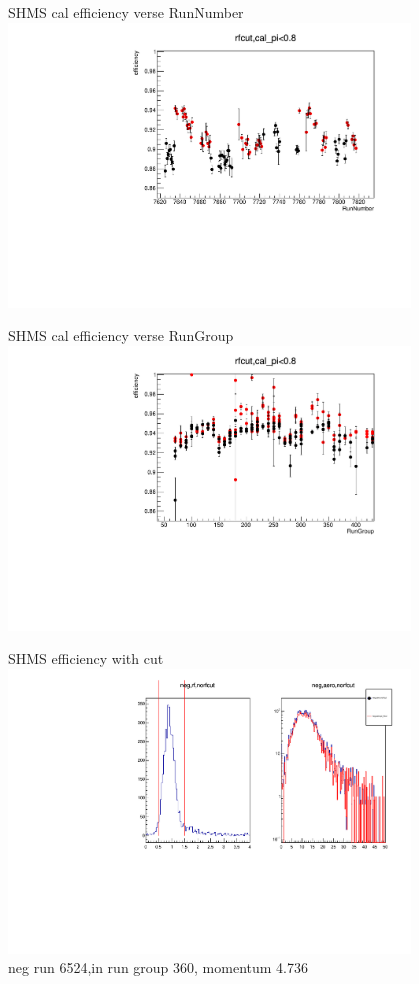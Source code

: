 \documentclass[aspectratio=169,xcolor=dvipsnames]{beamer}
\begin{document}
\begin{frame}{SHMS cal efficiency verse RunNumber}
  \includegraphics[width = 0.8\textwidth]{results/pid/SHMS_cal_DE_RunNumber_spring.pdf}
\end{frame}
\begin{frame}{SHMS cal efficiency verse RunGroup}
  \includegraphics[width = 0.8\textwidth]{results/pid/SHMS_cal_DE_RunGroup.pdf}
\end{frame}
\begin{frame}{SHMS efficiency with cut}
  \includegraphics[width = 0.8\textwidth]{results/pid/SHMS_aero_DE_6524.pdf}
  \\
   neg run 6524,in run group 360, momentum 4.736
 
\end{frame}
\end{document}

